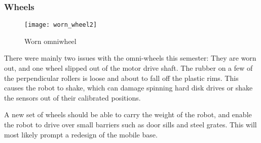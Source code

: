 \subsubsection{Wheels}

\begin{wrapfigure}{r}{0.5\textwidth}
	\vspace{-20pt}
	\begin{center}
		\texttt{[image: worn\_wheel2]}
	\end{center}
	
	\caption{Worn omniwheel}
	\label{fig:worn_wheel}
\end{wrapfigure}

There were mainly two issues with the omni-wheels this semester: They are worn out, and one wheel slipped out of the motor drive shaft. The rubber on a few of the perpendicular rollers is loose and about to fall off the plastic rims. This causes the robot to shake, which can damage spinning hard disk drives or shake the sensors out of their calibrated positions.   

A new set of wheels should be able to carry the weight of the robot, and enable the robot to drive over small barriers such as door sills and steel grates. This will most likely prompt a redesign of the mobile base.